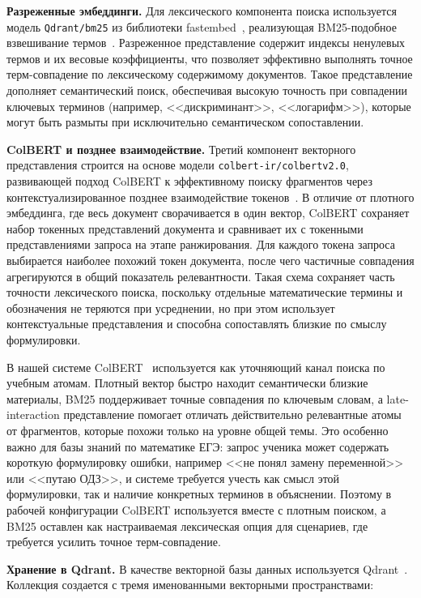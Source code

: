 \documentclass[a4paper,12pt]{extarticle}
\begin{document}
\textbf{Разреженные эмбеддинги.} Для лексического компонента поиска используется
модель \texttt{Qdrant/bm25} из библиотеки fastembed~\cite{fastembed2026}, реализующая BM25-подобное
взвешивание термов~\cite{robertson2009bm25}. Разреженное представление содержит
индексы ненулевых термов и их весовые коэффициенты, что позволяет эффективно
выполнять точное терм-совпадение по лексическому содержимому документов. Такое
представление дополняет семантический поиск, обеспечивая высокую точность при
совпадении ключевых терминов (например, <<дискриминант>>, <<логарифм>>), которые могут
быть размыты при исключительно семантическом сопоставлении.

\textbf{ColBERT и позднее взаимодействие.} Третий компонент векторного
представления строится на основе модели \texttt{colbert-ir/colbertv2.0},
развивающей подход ColBERT к эффективному поиску фрагментов через контекстуализированное
позднее взаимодействие токенов~\cite{khattab2020colbert}. В отличие от плотного
эмбеддинга, где весь документ сворачивается в один вектор, ColBERT сохраняет
набор токенных представлений документа и сравнивает их с токенными представлениями
запроса на этапе ранжирования. Для каждого токена запроса выбирается наиболее
похожий токен документа, после чего частичные совпадения агрегируются в общий
показатель релевантности. Такая схема сохраняет часть точности лексического поиска,
поскольку отдельные математические термины и обозначения не теряются при
усреднении, но при этом использует контекстуальные представления и способна
сопоставлять близкие по смыслу формулировки.

В нашей системе ColBERT~\cite{khattab2020colbert} используется как уточняющий канал поиска по учебным
атомам. Плотный вектор быстро находит семантически близкие материалы, BM25
поддерживает точные совпадения по ключевым словам, а late-interaction
представление помогает отличать действительно релевантные атомы от фрагментов,
которые похожи только на уровне общей темы. Это особенно важно для базы знаний
по математике ЕГЭ: запрос ученика может содержать короткую формулировку ошибки,
например <<не понял замену переменной>> или <<путаю ОДЗ>>, и системе требуется
учесть как смысл этой формулировки, так и наличие конкретных терминов в
объяснении. Поэтому в рабочей конфигурации ColBERT используется вместе с
плотным поиском, а BM25 оставлен как настраиваемая лексическая опция для
сценариев, где требуется усилить точное терм-совпадение.

\textbf{Хранение в Qdrant.} В качестве векторной базы данных используется
Qdrant~\cite{qdrant2026}. Коллекция создается с тремя именованными векторными
пространствами:
\end{document}
